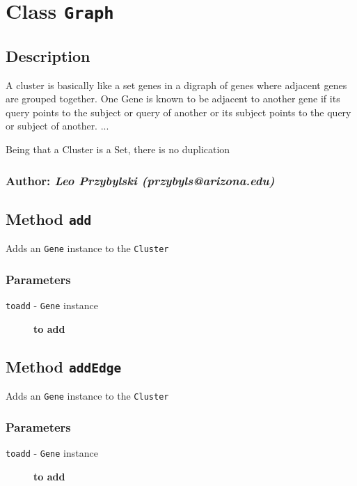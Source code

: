 
\section{Class \texttt{Graph}\label{Class_Graph}}
\subsection*{Description\label{Description}}


A cluster is basically like a set genes in a digraph of genes where 
adjacent genes are grouped together. One Gene is known to be adjacent 
to another gene if its query points to the subject or query of another
or its subject points to the query or subject of another.
...



Being that a Cluster is a Set, there is no duplication

\subsubsection*{Author: \textit{Leo Przybylski (przybyls@arizona.edu)}\label{Author:_Leo_Przybylski_przybyls_arizona_edu_}}
\subsection*{Method \texttt{add}\label{Method_add}}


Adds an \texttt{Gene} instance to the \texttt{Cluster}

\subsubsection*{Parameters\label{Parameters}}
\begin{description}

\item[{\texttt{toadd} - \texttt{Gene} instance}] \textbf{to add}\end{description}
\subsection*{Method \texttt{addEdge}\label{Method_addEdge}}


Adds an \texttt{Gene} instance to the \texttt{Cluster}

\subsubsection*{Parameters\label{Parameters}}
\begin{description}

\item[{\texttt{toadd} - \texttt{Gene} instance}] \textbf{to add}\end{description}
